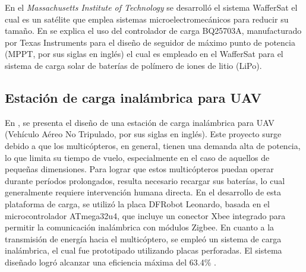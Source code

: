 En el \textit{Massachusetts Institute of Technology} se desarrolló el sistema WafferSat el cual  es un satélite que emplea 
sistemas microelectromecánicos para reducir su tamaño. En \cite{zapien_electrical_2020} se explica el uso del controlador de 
carga BQ25703A, manufacturado por Texas Instruments para el diseño de seguidor de máximo punto de potencia (MPPT, por
sus siglas en inglés) el cual es empleado en el WafferSat para el sistema de carga solar de baterías de polímero
 de iones de litio (LiPo).

\subsection*{Estación de carga inalámbrica para UAV}

En \cite{junaid_design_2016}, se presenta el diseño de una estación de carga inalámbrica para UAV
(Vehículo Aéreo No Tripulado, por sus siglas en inglés). Este proyecto surge debido a que los multicópteros,
 en general, tienen una demanda alta de potencia, lo que limita su tiempo de vuelo, especialmente en el caso
de aquellos de pequeñas dimensiones. Para lograr que estos multicópteros puedan operar durante períodos prolongados,
resulta necesario recargar sus baterías, lo cual generalmente requiere intervención humana directa. En el desarrollo
de esta plataforma de carga, se utilizó la placa DFRobot Leonardo, basada en el microcontrolador ATmega32u4, que
incluye un conector Xbee integrado para permitir la comunicación inalámbrica con módulos Zigbee. En cuanto a la transmisión
de energía hacia el multicóptero, se empleó un sistema de carga inalámbrica, el cual fue prototipado utilizando placas perforadas.
 El sistema diseñado logró alcanzar una eficiencia máxima del 63.4\% \cite{junaid_design_2016}.

